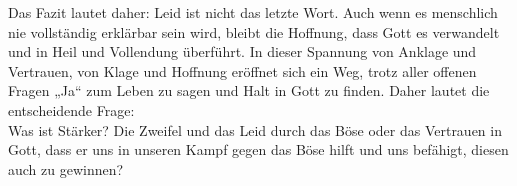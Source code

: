 Das Fazit lautet daher: Leid ist nicht das letzte Wort. Auch wenn es menschlich nie vollständig erklärbar sein wird, bleibt die Hoffnung, dass Gott es verwandelt und in Heil und Vollendung überführt. In dieser Spannung von Anklage und Vertrauen, von Klage und Hoffnung eröffnet sich ein Weg, trotz aller offenen Fragen „Ja“ zum Leben zu sagen und Halt in Gott zu finden. Daher lautet die entscheidende Frage:\\
Was ist Stärker? Die Zweifel und das Leid durch das Böse oder das Vertrauen in Gott, dass er uns in unseren Kampf gegen das Böse hilft und uns befähigt, diesen auch zu gewinnen?
